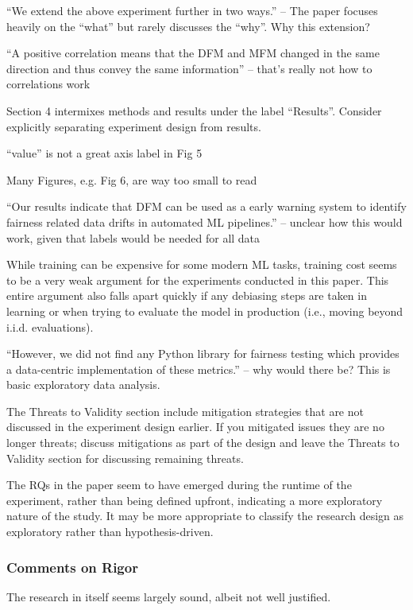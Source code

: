 \documentclass[conference,review,anonymous]{IEEEtran}
\begin{document}
\begin{IEEEitemize}
  \item ``We extend the above experiment further in two ways.'' -- The paper focuses heavily on the “what” but rarely discusses the “why”. Why this extension?
  \item ``A positive correlation means that the DFM and MFM changed in the same direction and thus convey the same information'' -- that’s really not how to correlations work
  \item Section 4 intermixes methods and results under the label ``Results''. Consider explicitly separating experiment design from results.
  \item ``value'' is not a great axis label in Fig 5
  \item Many Figures, e.g. Fig 6, are way too small to read
  \item ``Our results indicate that DFM can be used as a early warning system to identify fairness related data drifts in automated ML pipelines.'' -- unclear how this would work, given that labels would be needed for all data
  \item While training can be expensive for some modern ML tasks, training cost seems to be a very weak argument for the experiments conducted in this paper. This entire argument also falls apart quickly if any debiasing steps are taken in learning or when trying to evaluate the model in production (i.e., moving beyond i.i.d. evaluations).
  \item ``However, we did not find any Python library for fairness testing which provides a data-centric implementation of these metrics.'' -- why would there be? This is basic exploratory data analysis.
  \item The Threats to Validity section include mitigation strategies that are not discussed in the experiment design earlier. If you mitigated issues they are no longer threats; discuss mitigations as part of the design and leave the Threats to Validity section for discussing remaining threats.
  \item The RQs in the paper seem to have emerged during the runtime of the experiment, rather than being defined upfront, indicating a more exploratory nature of the study. It may be more appropriate to classify the research design as exploratory rather than hypothesis-driven.
\end{IEEEitemize}

\subsubsection{Comments on Rigor}
The research in itself seems largely sound, albeit not well justified.
\end{document}
